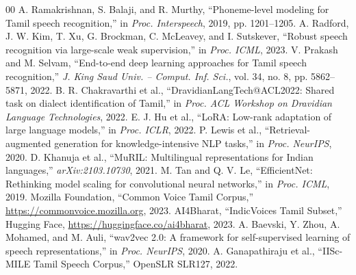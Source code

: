 \documentclass[conference]{IEEEtran}
\begin{document}
\begin{thebibliography}{00}
 A. Ramakrishnan, S. Balaji, and R. Murthy, ``Phoneme-level modeling for Tamil speech recognition,'' in \textit{Proc. Interspeech}, 2019, pp. 1201--1205.
 A. Radford, J. W. Kim, T. Xu, G. Brockman, C. McLeavey, and I. Sutskever, ``Robust speech recognition via large-scale weak supervision,'' in \textit{Proc. ICML}, 2023.
 V. Prakash and M. Selvam, ``End-to-end deep learning approaches for Tamil speech recognition,'' \textit{J. King Saud Univ. -- Comput. Inf. Sci.}, vol. 34, no. 8, pp. 5862--5871, 2022.
 B. R. Chakravarthi et al., ``DravidianLangTech@ACL2022: Shared task on dialect identification of Tamil,'' in \textit{Proc. ACL Workshop on Dravidian Language Technologies}, 2022.
 E. J. Hu et al., ``LoRA: Low-rank adaptation of large language models,'' in \textit{Proc. ICLR}, 2022.
 P. Lewis et al., ``Retrieval-augmented generation for knowledge-intensive NLP tasks,'' in \textit{Proc. NeurIPS}, 2020.
 D. Khanuja et al., ``MuRIL: Multilingual representations for Indian languages,'' \textit{arXiv:2103.10730}, 2021.
 M. Tan and Q. V. Le, ``EfficientNet: Rethinking model scaling for convolutional neural networks,'' in \textit{Proc. ICML}, 2019.
 Mozilla Foundation, ``Common Voice Tamil Corpus,'' \url{https://commonvoice.mozilla.org}, 2023.
 AI4Bharat, ``IndicVoices Tamil Subset,'' Hugging Face, \url{https://huggingface.co/ai4bharat}, 2023.
 A. Baevski, Y. Zhou, A. Mohamed, and M. Auli, ``wav2vec 2.0: A framework for self-supervised learning of speech representations,'' in \textit{Proc. NeurIPS}, 2020.
 A. Ganapathiraju et al., ``IISc-MILE Tamil Speech Corpus,'' OpenSLR SLR127, 2022.
\end{thebibliography}
\end{document}
